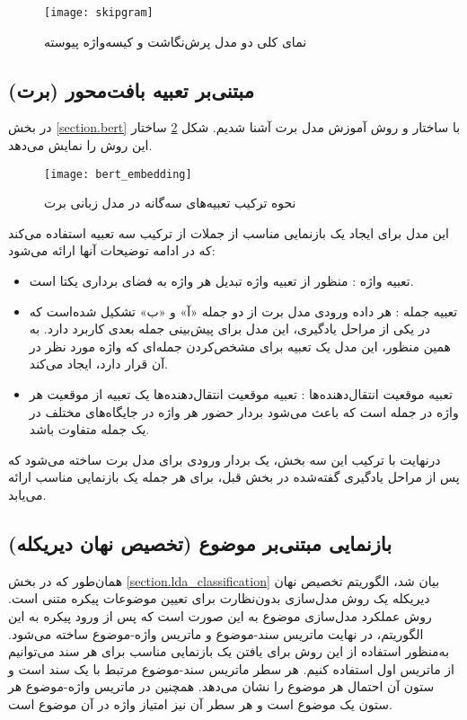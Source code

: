 \begin{figure}[h!]
	\texttt{[image: skipgram]}
	\centering
	\caption{نمای کلی دو مدل پرش‌نگاشت و کیسه‌واژه پیوسته \citep{suleiman2017deep}}
	\label{fig.skipgram}
\end{figure}

\subsection{مبتنی‌بر تعبیه بافت‌محور (برت)}
در بخش \ref{section.bert} با ساختار و روش آموزش مدل برت آشنا شدیم. شکل  \figurename \ref{fig.bert_embedding} 
ساختار این روش را نمایش می‌دهد.



\begin{figure}[!h]
	\texttt{[image: bert\_embedding]}
	\centering
	\caption{نحوه ترکیب تعبیه‌های سه‌گانه در مدل زبانی برت \citep{devlin2018bert}}
	\label{fig.bert_embedding}
\end{figure}



این مدل برای ایجاد یک بازنمایی مناسب از جملات از ترکیب سه تعبیه استفاده می‌کند که در ادامه توضیحات آنها ارائه می‌شود:
\begin{itemize}
	\item{تعبیه واژه }: منظور از تعبیه واژه تبدیل هر واژه به فضای برداری یکتا است.
	
	\item{تعبیه جمله }: هر داده ورودی مدل برت از دو جمله «آ» و «ب» تشکیل شده‌است که در یکی از مراحل یادگیری، این مدل برای پیش‌بینی جمله بعدی کاربرد دارد. به همین منظور، این مدل یک تعبیه برای مشخص‌کردن جمله‌ای که واژه مورد نظر در آن قرار دارد، ایجاد می‌کند.
	\item{تعبیه موقعیت انتقال‌دهنده‌ها }: تعبیه موقعیت انتقال‌دهنده‌ها یک تعبیه از موقعیت هر واژه در جمله است که باعث می‌شود بردار حضور هر واژه در جایگاه‌های مختلف در یک جمله متفاوت باشد.
\end{itemize}

درنهایت با ترکیب این سه بخش، یک بردار ورودی برای مدل برت ساخته می‌شود که پس از مراحل یادگیری گفته‌شده در بخش قبل، برای هر جمله یک بازنمایی مناسب ارائه می‌یابد.


\subsection{بازنمایی مبتنی‌بر موضوع (تخصیص نهان دیریکله)}
همان‌طور که در بخش \ref{section.lda_classification} بیان شد، الگوریتم تخصیص نهان دیریکله یک روش مدل‌سازی بدون‌نظارت برای تعیین موضوعات پیکره متنی است. روش عملکرد مدل‌سازی موضوع به این صورت است که پس از ورود پیکره به این الگوریتم، در نهایت ماتریس سند-موضوع و ماتریس واژه-موضوع ساخته می‌شود. به‌منظور استفاده از این روش برای یافتن یک بازنمایی مناسب برای هر سند می‌توانیم از ماتریس اول استفاده کنیم. هر سطر ماتریس سند-موضوع مرتبط با یک سند است و ستون آن احتمال هر موضوع را نشان می‌دهد. همچنین در ماتریس واژه-موضوع هر ستون یک موضوع است و هر سطر آن نیز امتیاز واژه در آن موضوع است.
